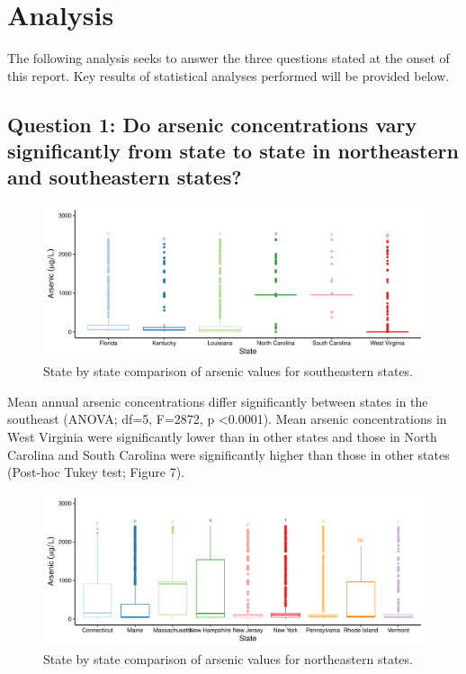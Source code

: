 \documentclass[12pt,]{article}
\begin{document}
\newpage

\hypertarget{analysis}{%
\section{Analysis}\label{analysis}}

The following analysis seeks to answer the three questions stated at the
onset of this report. Key results of statistical analyses performed will
be provided below.

\hypertarget{question-1-do-arsenic-concentrations-vary-significantly-from-state-to-state-in-northeastern-and-southeastern-states}{%
\subsection{Question 1: Do arsenic concentrations vary significantly
from state to state in northeastern and southeastern
states?}\label{question-1-do-arsenic-concentrations-vary-significantly-from-state-to-state-in-northeastern-and-southeastern-states}}

\begin{figure}
\centering
\includegraphics{Project_Template_files/figure-latex/figs7-1.pdf}
\caption{State by state comparison of arsenic values for southeastern
states.}
\end{figure}

Mean annual arsenic concentrations differ significantly between states
in the southeast (ANOVA; df=5, F=2872, p \textless{}0.0001). Mean
arsenic concentrations in West Virginia were significantly lower than in
other states and those in North Carolina and South Carolina were
significantly higher than those in other states (Post-hoc Tukey test;
Figure 7).

\newpage

\begin{figure}
\centering
\includegraphics{Project_Template_files/figure-latex/figs8-1.pdf}
\caption{State by state comparison of arsenic values for northeastern
states.}
\end{figure}
\end{document}
